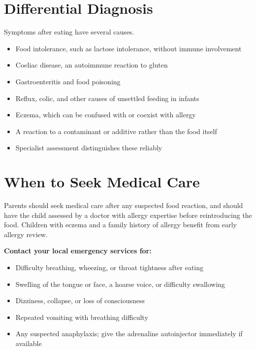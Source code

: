 \section*{Differential Diagnosis}
Symptoms after eating have several causes.
\begin{itemize}
    \item Food intolerance, such as lactose intolerance, without immune involvement
    \item Coeliac disease, an autoimmune reaction to gluten
    \item Gastroenteritis and food poisoning
    \item Reflux, colic, and other causes of unsettled feeding in infants
    \item Eczema, which can be confused with or coexist with allergy
    \item A reaction to a contaminant or additive rather than the food itself
    \item Specialist assessment distinguishes these reliably
\end{itemize}

\section*{When to Seek Medical Care}
Parents should seek medical care after any suspected food reaction, and should have the child assessed by a doctor with allergy expertise before reintroducing the food. Children with eczema and a family history of allergy benefit from early allergy review.

\textbf{Contact your local emergency services for:}
\begin{itemize}
    \item Difficulty breathing, wheezing, or throat tightness after eating
    \item Swelling of the tongue or face, a hoarse voice, or difficulty swallowing
    \item Dizziness, collapse, or loss of consciousness
    \item Repeated vomiting with breathing difficulty
    \item Any suspected anaphylaxis; give the adrenaline autoinjector immediately if available
\end{itemize}

